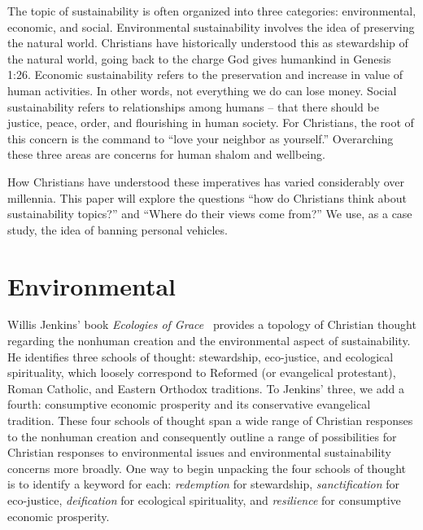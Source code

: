 \documentclass[12pt]{article}
\begin{document}
The topic of sustainability is often organized into three categories: environmental, economic, and
social. Environmental sustainability involves the idea of preserving the natural world.
Christians have historically understood this as stewardship of the natural world, going
back to the charge God gives humankind in Genesis 1:26. Economic sustainability refers to
the preservation and increase in value of human activities. In other words, not everything
we do can lose money. Social sustainability refers to relationships among humans -- that
there should be justice, peace, order, and flourishing in human society. For Christians,
the root of this concern is the command to ``love your neighbor as yourself.'' Overarching
these three areas are concerns for human shalom and wellbeing.

How Christians have understood these imperatives has varied considerably over millennia. 
This paper will explore the questions ``how do Christians think about
sustainability topics?'' and ``Where do their views come from?'' 
We use, as a case study, the idea of banning personal vehicles.



\section{Environmental}
\label{sec:environmental}

Willis Jenkins' book \emph{Ecologies of Grace}~\autocite{Jenkins:2008}
provides a topology of Christian thought regarding the 
nonhuman creation and the
environmental aspect of sustainability.
He identifies three schools of thought:
stewardship, 
eco-justice, and 
ecological spirituality,
which loosely correspond to 
Reformed (or evangelical protestant), 
Roman Catholic, and 
Eastern Orthodox 
traditions.
To Jenkins' three, we add a fourth:
consumptive economic prosperity and
its conservative evangelical tradition. 
These four schools of thought 
span a wide range of Christian responses to the nonhuman creation
and 
consequently outline a range of possibilities 
for Christian responses to environmental issues
and environmental sustainability concerns more broadly.
One way to begin unpacking the four schools of thought 
is to identify a keyword for each:
\emph{redemption} for stewardship, 
\emph{sanctification} for eco-justice,
\emph{deification} for ecological spirituality, and
\emph{resilience} for consumptive economic prosperity.
\end{document}
